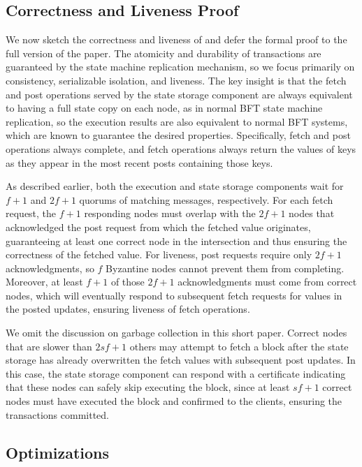 \subsection{Correctness and Liveness Proof}

We now sketch the correctness and liveness of \sys and defer the formal proof to the full version of the paper.
The atomicity and durability of transactions are guaranteed by the state machine replication mechanism, so we focus primarily on consistency, serializable isolation, and liveness.
The key insight is that the fetch and post operations served by the state storage component are always equivalent to having a full state copy on each node, as in normal BFT state machine replication, so the execution results are also equivalent to normal BFT systems, which are known to guarantee the desired properties.
Specifically, fetch and post operations always complete, and fetch operations always return the values of keys as they appear in the most recent posts containing those keys.

As described earlier, both the execution and state storage components wait for $f+1$ and $2f+1$ quorums of matching messages, respectively.
For each fetch request, the $f+1$ responding nodes must overlap with the $2f+1$ nodes that acknowledged the post request from which the fetched value originates, guaranteeing at least one correct node in the intersection and thus ensuring the correctness of the fetched value.
For liveness, post requests require only $2f+1$ acknowledgments, so $f$ Byzantine nodes cannot prevent them from completing.
Moreover, at least $f+1$ of those $2f+1$ acknowledgments must come from correct nodes, which will eventually respond to subsequent fetch requests for values in the posted updates, ensuring liveness of fetch operations.

We omit the discussion on garbage collection in this short paper.
Correct nodes that are slower than $2sf+1$ others may attempt to fetch a block after the state storage has already overwritten the fetch values with subsequent post updates.
In this case, the state storage component can respond with a certificate indicating that these nodes can safely skip executing the block, since at least $sf+1$ correct nodes must have executed the block and confirmed to the clients, ensuring the transactions committed.

\subsection{Optimizations}


